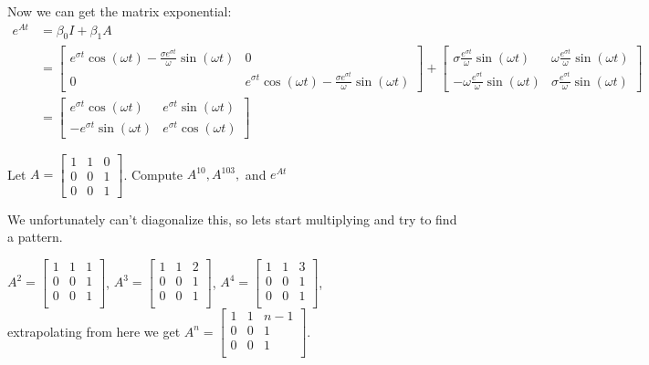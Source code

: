 \documentclass[11pt]{article}
\begin{document}
Now we can get the matrix exponential:
\begin{align*}
    e^{At} &= \beta_0 I + \beta_1 A\\
    &= \begin{bmatrix}
        e^{\sigma t} \cos(\omega t) - \frac{\sigma e^{\sigma t}}{\omega} \sin(\omega t) & 0\\0 & e^{\sigma t} \cos(\omega t) - \frac{\sigma e^{\sigma t}}{\omega} \sin(\omega t)
    \end{bmatrix} +
    \begin{bmatrix}
        \sigma \frac{e^{\sigma t}}{\omega} \sin(\omega t) & \omega \frac{e^{\sigma t}}{\omega} \sin(\omega t) \\
        -\omega \frac{e^{\sigma t}}{\omega} \sin(\omega t) & \sigma \frac{e^{\sigma t}}{\omega} \sin(\omega t)
    \end{bmatrix}\\
    &=
    \begin{bmatrix}
        e^{\sigma t} \cos(\omega t) & e^{\sigma t} \sin(\omega t) \\
        - e^{\sigma t} \sin(\omega t) & e^{\sigma t} \cos(\omega t) 
    \end{bmatrix}
\end{align*}



Let $A = \begin{bmatrix}
    1 & 1 & 0 \\ 0 & 0 & 1 \\ 0 & 0 & 1
\end{bmatrix}$.
Compute $A^{10}, A^{103}, $ and $e^{At}$

\soln

We unfortunately can't diagonalize this, so lets start multiplying and try to find a pattern.

$A^2 = 
\begin{bmatrix}
    1 & 1 & 1 \\
    0 & 0 & 1 \\
    0 & 0 & 1 \\
\end{bmatrix}
$, $A^3 = 
\begin{bmatrix}
    1 & 1 & 2 \\
    0 & 0 & 1 \\
    0 & 0 & 1 \\
\end{bmatrix}
$, $A^4 = 
\begin{bmatrix}
    1 & 1 & 3 \\
    0 & 0 & 1 \\
    0 & 0 & 1 \\
\end{bmatrix}
$,\\ extrapolating from here we get
$A^n = 
\begin{bmatrix}
    1 & 1 & n-1 \\
    0 & 0 & 1 \\
    0 & 0 & 1 \\
\end{bmatrix}
$.
\end{document}
